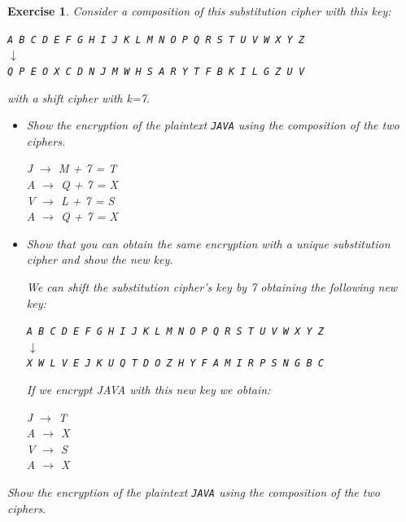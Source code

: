 \documentclass[a4paper, 12pt]{report}
\newtheorem{exercise}{\textbf{Exercise}}
\begin{document}
\begin{exercise}
	Consider a composition of this substitution cipher with this key:
	\begin{center}
		\texttt{A B C D E F G H I J K L M N O P Q R S T U V W X Y Z}\\
		$\downarrow$\\
		\texttt{Q P E O X C D N J M W H S A R Y T F B K I L G Z U V}
	\end{center}
	with a shift cipher with k=7.
	\begin{itemize}
		\item Show the encryption of the plaintext \texttt{JAVA} using the composition of the two ciphers.
		
		\begin{center}
			J $\rightarrow$ M + 7 = T\\
			A $\rightarrow$ Q + 7 = X\\
			V $\rightarrow$ L + 7 = S\\
			A $\rightarrow$ Q + 7 = X\\
		\end{center}
		\item Show that you can obtain the same encryption with a unique substitution cipher and show the new key.
		
		We can shift the substitution cipher's key by 7 obtaining the following new key:
		\begin{center}
			\texttt{A B C D E F G H I J K L M N O P Q R S T U V W X Y Z}\\
			$\downarrow$\\
			\texttt{X W L V E J K U Q T D O Z H Y F A M I R P S N G B C}
		\end{center}
		If we encrypt JAVA with this new key we obtain:
		\begin{center}
			J $\rightarrow$ T\\
			A $\rightarrow$ X\\
			V $\rightarrow$ S\\
			A $\rightarrow$ X\\
		\end{center}
	\end{itemize}
	Show the encryption of the plaintext \texttt{JAVA} using the composition of the two ciphers.
\end{exercise}
\end{document}
